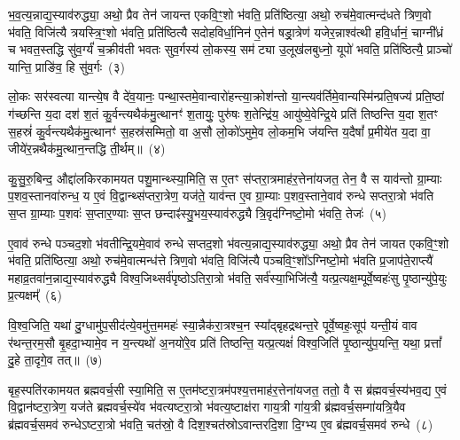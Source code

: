 भ॒व॒त्य॒न्नाद्य॒स्याव॑रुद्ध्या॒ अथो॒ प्रैव तेन॑ जायन्त एकवि॒ꣳ॒शो भ॑वति॒ प्रति॑ष्ठित्या॒ अथो॒ रुच॑मे॒वात्मन्द॑धते त्रिण॒वो भ॑वति॒ विजि॑त्यै त्रयस्त्रि॒ꣳ॒शो भ॑वति॒ प्रति॑ष्ठित्यै सदोहविर्धा॒निन॑ ए॒तेन॑ षड्रा॒त्रेण॑ यजेर॒न्नाश्व॑त्थी हवि॒र्धानं॒ चाग्नी᳚ध्रं च भवत॒स्तद्धि सु॑व॒र्ग्यं॑ च॒क्रीव॑ती भवतः सुव॒र्गस्य॑ लो॒कस्य॒ सम॑ट्या उ॒लूख॑लबुध्नो॒ यूपो॑ भवति॒ प्रति॑ष्ठित्यै॒ प्राञ्चो॑ यान्ति॒ प्राङि॑व॒ हि सु॑व॒र्गः~(३)

लो॒कः सर॑स्वत्या यान्त्ये॒ष वै दे॑व॒यानः॒ पन्था॒स्तमे॒वान्वारो॑हन्त्या॒क्रोश॑न्तो या॒न्त्यव॑र्तिमे॒वान्यस्मि॑न्प्रति॒षज्य॑ प्रति॒ष्ठां ग॑च्छन्ति य॒दा दश॑ श॒तं कु॒र्वन्त्यथैक॑मु॒त्थानꣳ॑ श॒तायुः॒ पुरु॑षः श॒तेन्द्रि॑य॒ आयु॑ष्ये॒वेन्द्रि॒ये प्रति॑ तिष्ठन्ति य॒दा श॒तꣳ स॒हस्रं॑ कु॒र्वन्त्यथैक॑मु॒त्थानꣳ॑ स॒हस्र॑सम्मितो॒ वा अ॒सौ लो॒को॑\-ऽमुमे॒व लो॒कम॒भि ज॑यन्ति य॒दैषां᳚ प्र॒मीये॑त य॒दा वा॒ जीये॑र॒न्नथैक॑मु॒त्थान॒न्तद्धि ती॒र्थम्॥~(४)

{\anuvakamend[{पृ॒ष्ठानि॑ सप्तद॒शः सु॑व॒र्गो ज॑यन्ति य॒दैका॑\-दश च}]}%

कु॒सु॒रु॒बिन्द॒ औद्दा॑लकिरकामयत पशु॒मान्थ्स्या॒मिति॒ स ए॒तꣳ स॑प्तरा॒त्रमाह॑र॒त्तेना॑यजत॒ तेन॒ वै स याव॑न्तो ग्रा॒म्याः प॒शव॒स्तानवा॑रुन्ध॒ य ए॒वं वि॒द्वान्थ्स॑प्तरा॒त्रेण॒ यज॑ते॒ याव॑न्त ए॒व ग्रा॒म्याः प॒शव॒स्ताने॒वाव॑ रुन्धे सप्तरा॒त्रो भ॑वति स॒प्त ग्रा॒म्याः प॒शवः॑ स॒प्तार॒ण्याः स॒प्त छन्दाꣴ॑स्यु॒भय॒स्याव॑रुद्ध्यै त्रि॒वृद॑ग्निष्टो॒मो भ॑वति॒ तेजः॑~(५)

ए॒वाव॑ रुन्धे पञ्चद॒शो भ॑वतीन्द्रि॒यमे॒वाव॑ रुन्धे सप्तद॒शो भ॑वत्य॒न्नाद्य॒स्याव॑रुद्ध्या॒ अथो॒ प्रैव तेन॑ जायत एकवि॒ꣳ॒शो भ॑वति॒ प्रति॑ष्ठित्या॒ अथो॒ रुच॑मे॒वात्मन्ध॑त्ते त्रिण॒वो भ॑वति॒ विजि॑त्यै पञ्चवि॒ꣳ॒शो᳚\-ऽग्निष्टो॒मो भ॑वति प्र॒जाप॑ते॒राप्त्यै॑ महाव्र॒तवा॑न॒न्नाद्य॒स्याव॑रुद्ध्यै विश्व॒जिथ्सर्व॑पृष्ठो\-ऽतिरा॒त्रो भ॑वति॒ सर्व॑स्या॒भिजि॑त्यै॒ यत्प्र॒त्यक्ष॒म्पूर्वे॒ष्वहः॑सु पृ॒ष्ठान्यु॑पे॒युः प्र॒त्यक्षम्᳚~(६)

वि॒श्व॒जिति॒ यथा॑ दु॒ग्धामु॑प॒सीद॑त्ये॒वमु॑त्त॒ममहः॑ स्या॒न्नैक॑रा॒त्रश्च॒न स्या᳚द्बृहद्रथन्त॒रे पूर्वे॒ष्वहः॒सूप॑ यन्ती॒यं वाव र॑थन्त॒रम॒सौ बृ॒हदा॒भ्यामे॒व न य॒न्त्यथो॑ अ॒नयो॑रे॒व प्रति॑ तिष्ठन्ति॒ यत्प्र॒त्यक्षं॑ विश्व॒जिति॑ पृ॒ष्ठान्यु॑प॒यन्ति॒ यथा॒ प्रत्तां᳚ दु॒हे ता॒दृगे॒व तत्॥~(७)

{\anuvakamend[{तेज॑ उपे॒युः प्र॒त्यक्षं॒ द्विच॑त्वारिꣳशच्च}]}%

बृह॒स्पति॑रकामयत ब्रह्मवर्च॒सी स्या॒मिति॒ स ए॒तम॑ष्टरा॒त्रम॑पश्य॒त्तमाह॑र॒त्तेना॑यजत॒ ततो॒ वै स ब्र॑ह्मवर्च॒स्य॑भव॒द्य ए॒वं वि॒द्वान॑ष्टरा॒त्रेण॒ यज॑ते ब्रह्मवर्च॒स्ये॑व भ॑वत्यष्टरा॒त्रो भ॑वत्य॒ष्टाक्ष॑रा गाय॒त्री गा॑य॒त्री ब्र॑ह्मवर्च॒सम्गा॑यत्रि॒यैव ब्र॑ह्मवर्च॒समव॑ रुन्धे\-ऽष्टरा॒त्रो भ॑वति॒ चत॑स्रो॒ वै दिश॒श्चत॑स्रो\-ऽवान्तरदि॒शा दि॒ग्भ्य ए॒व ब्र॑ह्मवर्च॒समव॑ रुन्धे~(८)


